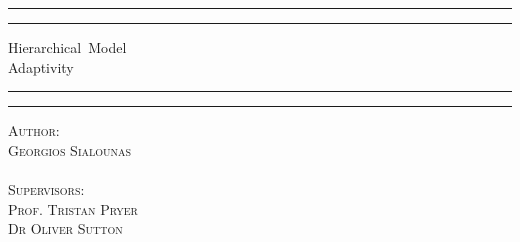 \documentclass[12pt,a4paper]{article}
\theoremstyle{definition}
\begin{document}
	\begin{titlepage} %
		\centering %
		\scshape %
		\rule{\textwidth}{1.6pt}\vspace*{-\baselineskip}\vspace*{2pt} %
		\rule{\textwidth}{0.4pt} %
		
		{\LARGE Hierarchical\ Model\\ Adaptivity\\} %
		
		\vspace{0.75\baselineskip} %
		
		\rule{\textwidth}{0.4pt}\vspace*{-\baselineskip}\vspace{3.2pt} %
		\rule{\textwidth}{1.6pt} %
		
		
		
		
		

		
		\vspace{0.5\baselineskip} %
		
		{\scshape\Large Author:\\ Georgios Sialounas \\$\,$\\ Supervisors: \\Prof. Tristan Pryer\\Dr Oliver Sutton} %
		

\end{titlepage}
\end{document}
